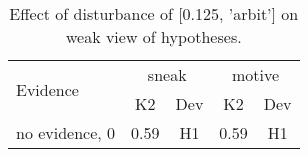 \begin{table}\begin{tabular}{l|cc|cc}\toprule\multirow{2}{*}{Evidence} & \multicolumn{2}{c}{sneak}& \multicolumn{2}{c}{motive}\\& {K2} & {Dev}& {K2} & {Dev}\\\midrule
no evidence, 0 & \cellcolor{Bittersweet}0.59&\cellcolor{Bittersweet}H1&\cellcolor{Bittersweet}0.59&\cellcolor{Bittersweet}H1\\\bottomrule\end{tabular}\caption{Effect of disturbance of [0.125, 'arbit'] on weak view of hypotheses.}\end{table}